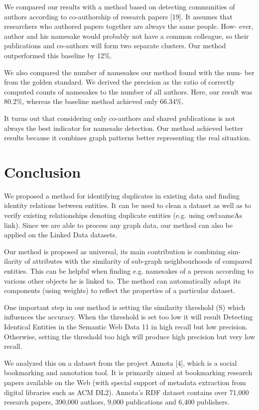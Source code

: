 \documentclass{llncs}
\begin{document}
We compared our results with a method based on detecting communities
of authors according to co-authorship of research papers [19]. It assumes that
researchers who authored papers together are always the same people. How-
ever, author and his namesake would probably not have a common colleague, so
their publications and co-authors will form two separate clusters. Our method
outperformed this baseline by 12\%.

We also compared the number of namesakes our method found with the num-
ber from the golden standard. We derived the precision as the ratio of correctly
computed counts of namesakes to the number of all authors. Here, our result
was 80.2\%, whereas the baseline method achieved only 66.34\%.

It turns out that considering only co-authors and shared publications is not
always the best indicator for namesake detection. Our method achieved better
results because it combines graph patterns better representing the real situation.

\section {Conclusion}

We proposed a method for identifying duplicates in existing data and finding
identity relations between entities. It can be used to clean a dataset as well as to
verify existing relationships denoting duplicate entities (e.g. using owl:sameAs
link). Since we are able to process any graph data, our method can also be
applied on the Linked Data datasets.

Our method is proposed as universal, its main contribution is combining sim-
ilarity of attributes with the similarity of sub-graph neighbourhoods of compared
entities. This can be helpful when finding e.g. namesakes of a person according
to various other objects he is linked to. The method can automatically adapt its
components (using weights) to reflect the properties of a particular dataset.

One important step in our method is setting the similarity threshold (S)
which influences the accuracy. When the threshold is set too low it will result
Detecting Identical Entities in the Semantic Web Data 11
in high recall but low precision. Otherwise, setting the threshold too high will
produce high precision but very low recall.

We analyzed this on a dataset from the project Annota [4], which is a social
bookmarking and annotation tool. It is primarily aimed at bookmarking research
papers available on the Web (with special support of metadata extraction from
digital libraries such as ACM DL2). Annota's RDF dataset contains over 71,000
research papers, 390,000 authors, 9,000 publications and 6,400 publishers.
\end{document}
